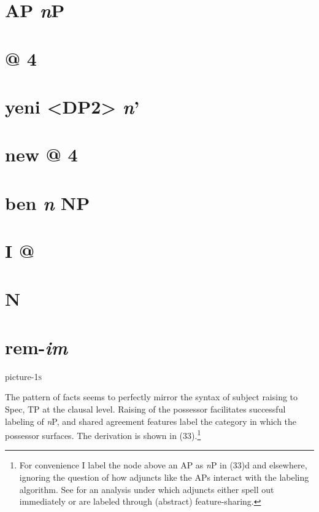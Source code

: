 \documentclass[output=paper
,modfonts
,nonflat]{langsci/langscibook}
\begin{document}
\section{                                                   AP                    \textit{n}P} 
\section{                                                     @      4}
\section{                                    yeni       <DP2>             \textit{n}’}
\section{                                                       new    @     4}
\section{ ben   \textit{n} NP }
\section{                                                           I                      @}
\section{                                                                              N}
\section{                                                                        rem-\textit{im}}

picture-1\textsc{s}

The pattern of facts seems to perfectly mirror the syntax of subject raising to Spec, TP at the clausal level. Raising of the possessor facilitates successful labeling of \textit{n}P, and shared agreement features label the category in which the possessor surfaces. The derivation is shown in (33).\footnote{For convenience I label the node above an AP as \textit{n}P in (33)d and elsewhere, ignoring the question of how adjuncts like the APs interact with the labeling algorithm. See \citealt{Oseki2014} for an analysis under which adjuncts either spell out immediately or are labeled through (abstract) feature-sharing.}
\end{document}
